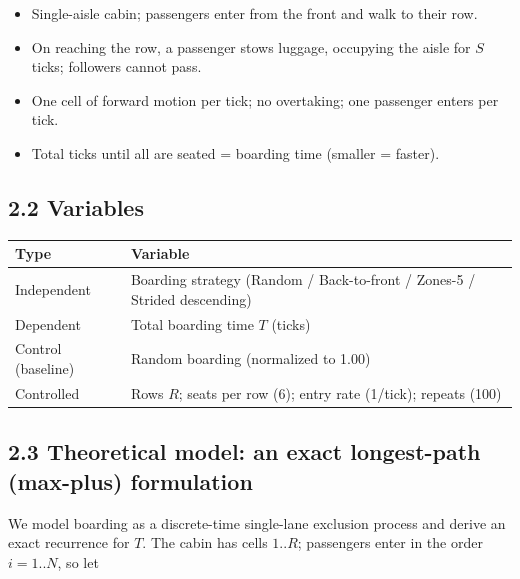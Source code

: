 \documentclass[
  11pt,
  a4paper]{article}
\newcounter{none} %
\providecommand{\tightlist}{%
  \setlength{\itemsep}{0pt}\setlength{\parskip}{0pt}}
\begin{document}
\begin{itemize}
\tightlist
\item
  Single-aisle cabin; passengers enter from the front and walk to their
  row.
\item
  On reaching the row, a passenger stows luggage, occupying the aisle
  for \(S\) ticks; followers cannot pass.
\item
  One cell of forward motion per tick; no overtaking; one passenger
  enters per tick.
\item
  Total ticks until all are seated = boarding time (smaller = faster).
\end{itemize}

\subsection{2.2 Variables}\label{variables}

{\def\LTcaptype{none} %
\begin{longtable}[]{@{}
  >{\raggedright\arraybackslash}p{}
  >{\raggedright\arraybackslash}p{}@{}}
\toprule\noalign{}
\begin{minipage}[b]{\linewidth}\raggedright
Type
\end{minipage} & \begin{minipage}[b]{\linewidth}\raggedright
Variable
\end{minipage} \\
\midrule\noalign{}
\endhead
\bottomrule\noalign{}
\endlastfoot
Independent & Boarding strategy (Random / Back-to-front / Zones-5 /
Strided descending) \\
Dependent & Total boarding time \(T\) (ticks) \\
Control (baseline) & Random boarding (normalized to 1.00) \\
Controlled & Rows \(R\); seats per row (6); entry rate (1/tick); repeats
(100) \\
\end{longtable}
}

\subsection{2.3 Theoretical model: an exact longest-path (max-plus)
formulation}\label{theoretical-model-an-exact-longest-path-max-plus-formulation}

We model boarding as a discrete-time single-lane exclusion process and
derive an exact recurrence for \(T\). The cabin has cells \(1..R\);
passengers enter in the order \(i=1..N\), so let
\end{document}
